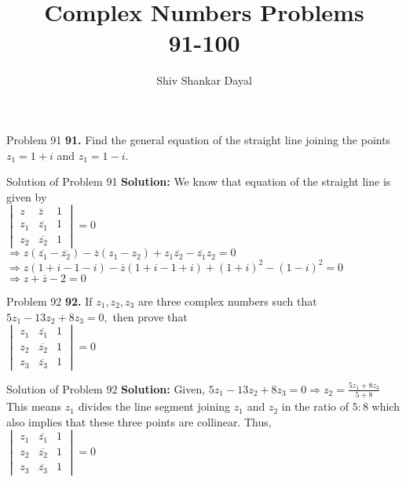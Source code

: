 \documentclass[aspectratio=169,8pt]{beamer}
\title{Complex Numbers Problems\\ 91-100}
\author[Shiv Shankar Dayal]{Shiv Shankar Dayal}
\begin{document}
\begin{frame}
  \titlepage
\end{frame}
\begin{frame}{Problem 91}
  \textbf{91.} Find the general equation of the straight line joining the points $z_1 = 1 + i$ and $z_1 = 1 - i.$
\end{frame}
\begin{frame}{Solution of Problem 91}
  \textbf{Solution:} We know that equation of the straight line is given by\\
  \vspace*{0.2cm}
  $\begin{vmatrix}z & \overline{z} & 1\\z_1 & \overline{z_1} & 1\\ z_2 & \overline{z_2} & 1\end{vmatrix} = 0$\\
    \vspace*{0.2cm}
    $\Rightarrow z(\overline{z_1} - \overline{z_2}) - \overline{z}(z_1 - z_2) + z_1\overline{z_2} - \overline{z_1}z_2 = 0$\\
    \vspace*{0.2cm}
    $\Rightarrow z(1 + i - 1 - i) - \overline{z}(1 + i -1 + i) + (1 + i)^2 - (1 - i)^2 = 0$\\
    \vspace*{0.2cm}
    $\Rightarrow z + \overline{z} - 2 = 0$
\end{frame}
\begin{frame}{Problem 92}
  \textbf{92.} If $z_1, z_2, z_3$ are three complex numbers such that $5z_1 - 13z_2 + 8z_3 = 0,$ then prove that\\
  $\begin{vmatrix}z_1 & \overline{z_1} & 1\\z_2 & \overline{z_2} & 1\\ z_3 & \overline{z_3} & 1\end{vmatrix} = 0$
\end{frame}
\begin{frame}{Solution of Problem 92}
  \textbf{Solution:} Given, $5z_1 - 13z_2 + 8z_3 = 0 \Rightarrow z_2 = \frac{5z_1 + 8z_3}{5 + 8}$\\
  \vspace*{0.2cm}
  This means $z_1$ divides the line segment joining $z_1$ and $z_2$ in the ratio of $5:8$ which also implies that these three
  points are collinear. Thus,\\
  \vspace*{0.2cm}
  $\begin{vmatrix}z_1 & \overline{z_1} & 1\\z_2 & \overline{z_2} & 1\\ z_3 & \overline{z_3} & 1\end{vmatrix} = 0$
\end{frame}
\end{document}
